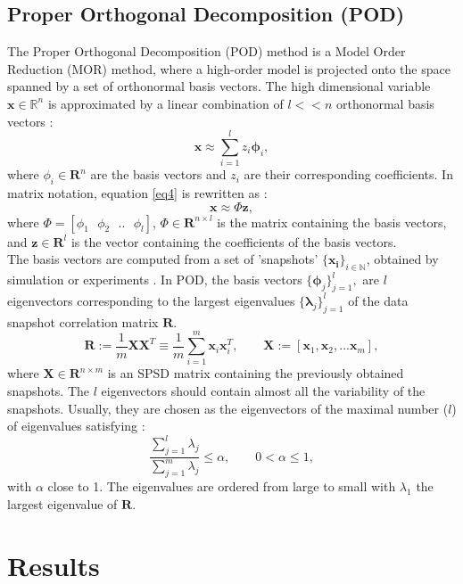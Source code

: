 \documentclass{ecmorXV}
\begin{document}
\subsection{Proper Orthogonal Decomposition (POD)}
\hspace{0.5cm}The Proper Orthogonal Decomposition (POD) 
method is a Model Order Reduction (MOR) method, where a high-order model is projected onto the space
spanned by a set of orthonormal basis vectors.
The high dimensional variable $\mathbf{x} \in \mathbb{R}^n$
is approximated by a linear combination of $l<<n$ orthonormal basis vectors \cite{Astrid11}:
\begin{equation}\label{eq4}
  \mathbf{x}\approx \sum_{i=1}^lz_i \mathbf{\phi}_i,
\end{equation}
where $\phi_i \in \mathbf{R}^n$ are the basis vectors and $z_i$ are their corresponding coefficients.
In matrix notation, equation \eqref{eq4} is rewritten as :
$$\mathbf{x}\approx \Phi\mathbf{z},$$
where $\Phi=[\phi_1 \text{ }\phi_2 \text{ }.. \text{ }\phi_l]$, $\Phi \in \mathbf{R}^{n\times l}$ 
is the matrix containing the basis vectors, and $\mathbf{z} \in \mathbf{R}^l$ is the vector 
containing the coefficients of the basis vectors. \\
The basis vectors are computed from a set of 'snapshots' $\{ \mathbf{x_i}\} _{i\in \mathbb{N}}$, 
obtained by simulation or experiments \cite{Mark06}. 
In POD, the basis vectors $\{ \mathbf{\phi} _j \} ^l _{j=1},$ are $l$ eigenvectors corresponding to 
the largest eigenvalues $\{ \mathbf{\lambda} _j \} ^l _{j=1}$ of the data snapshot correlation matrix $\mathbf{R}$.
\begin{equation}\label{eq:POD}
\mathbf{R}:= \frac{1}{m}\mathbf{X}\mathbf{X}^T \equiv \frac{1}{m} \sum_{i=1}^m \mathbf{x}_i \mathbf{x}_i^T,
\qquad \mathbf{X}:=[\mathbf{x}_1,\mathbf{x}_2,...\mathbf{x}_m],
\end{equation}
where $\mathbf{X}\in \mathbf{R}^{n\times m}$ is an SPSD matrix containing the previously obtained snapshots.
The $l$ eigenvectors should contain almost all the variability of the snapshots. 
Usually, they are chosen as the eigenvectors of the maximal number ($l$) of eigenvalues satisfying \cite{Mark06}:
\begin{equation}
\frac{\sum_{j=1}^l\lambda_j}{\sum_{j=1}^m\lambda_j}\leq \alpha, \qquad 0<\alpha \leq 1,
\end{equation}
with $\alpha$ close to 1. The eigenvalues are ordered from large to small with $\lambda_1$ 
the largest eigenvalue of $\mathbf{R}$.
\section{Results}
\end{document}
